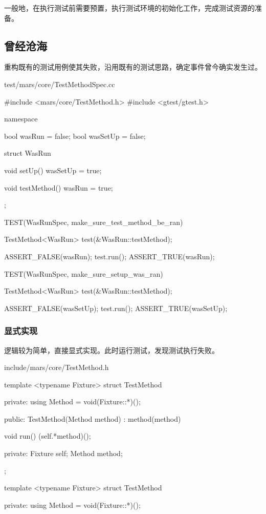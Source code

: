 \begin{content}

一般地，在执行测试前需要预置，执行测试环境的初始化工作，完成测试资源的准备。

\subsection{曾经沧海}

重构既有的测试用例使其失败，沿用既有的测试思路，确定事件曾今确实发生过。

\begin{nodiff}{test/mars/core/TestMethodSpec.cc}
\begin{c++}
#include <mars/core/TestMethod.h>
#include <gtest/gtest.h>

namespace {
  bool wasRun = false;
  bool wasSetUp = false;

  struct WasRun {
    void setUp() {
      wasSetUp = true;
    }

    void testMethod() {
      wasRun = true;
    }
  };
}

TEST(WasRunSpec, make_sure_test_method_be_ran) {
  TestMethod<WasRun> test(&WasRun::testMethod);

  ASSERT_FALSE(wasRun);
  test.run();
  ASSERT_TRUE(wasRun);
}

TEST(WasRunSpec, make_sure_setup_was_ran) {
  TestMethod<WasRun> test(&WasRun::testMethod);

  ASSERT_FALSE(wasSetUp);
  test.run();
  ASSERT_TRUE(wasSetUp);
}
\end{c++}
\end{nodiff}

\subsubsection{显式实现}

逻辑较为简单，直接显式实现。此时运行测试，发现测试执行失败。

\begin{diff}{include/mars/core/TestMethod.h}
\begin{minicpp}
template <typename Fixture>
struct TestMethod {
private:
  using Method = void(Fixture::*)();

public:
  TestMethod(Method method)
    : method(method) {}

  void run() {
    (self.*method)();
  }

private:
  Fixture self;
  Method method;
};
\end{minicpp}
\tcblower
\begin{minicpp}
template <typename Fixture>
struct TestMethod {
private:
  using Method = void(Fixture::*)();

}
\end{minicpp}
\end{diff}
\end{content}
